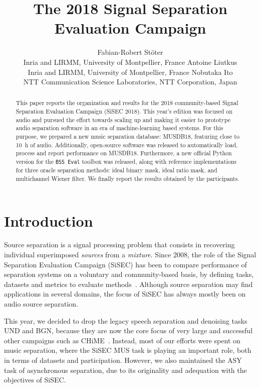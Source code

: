 \documentclass{article}
\begin{document}
\title{The 2018 Signal Separation Evaluation Campaign}

\author{
  Fabian-Robert St\"oter \\
  Inria and LIRMM, University of Montpellier, France
  \And
  Antoine Liutkus \\
  Inria and LIRMM, University of Montpellier, France
  \And
  Nobutaka Ito \\
  NTT Communication Science Laboratories, NTT Corporation, Japan
}

\maketitle
%
\begin{abstract}
This paper reports the organization and results for the 2018 community-based Signal Separation Evaluation Campaign (SiSEC 2018). This year's edition was focused on audio and pursued the effort towards scaling up and making it easier to prototype audio separation software in an era of machine-learning based systems. For this purpose, we prepared a new music separation database: MUSDB18, featuring close to 10~h of audio. Additionally, open-source software was released to automatically load, process and report performance on MUSDB18. Furthermore, a new official Python version for the \texttt{BSS~Eval} toolbox was released, along with reference implementations for three oracle separation methods: ideal binary mask, ideal ratio mask, and multichannel Wiener filter. We finally report the results obtained by the participants.
\end{abstract}

\setcounter{footnote}{0}
\section{Introduction}
Source separation is a signal processing problem that consists in recovering individual superimposed \textit{sources} from a \textit{mixture}.  Since 2008, the role of the Signal Separation Evaluation Campaign (SiSEC) has been to compare performance of separation systems on a voluntary and community-based basis, by defining tasks, datasets and metrics to evaluate methods~\cite{sassec2007,sisec2008,sisec0710,sisec2011,sisec2013,sisec2015,sisec2016}. Although source separation may find applications in several domains, the focus of SiSEC has always mostly been on audio source separation.

This year, we decided to drop the legacy speech separation and denoising tasks UND and BGN, because they are now the core focus of very large and successful other campaigns such as CHiME~\cite{chime,chime2,chime3}. Instead, most of our efforts were spent on music separation, where the SiSEC MUS task is playing an important role, both in terms of datasets and participation. However, we also maintained the ASY task of asynchronous separation, due to its originality and adequation with the objectives of SiSEC.
\end{document}
